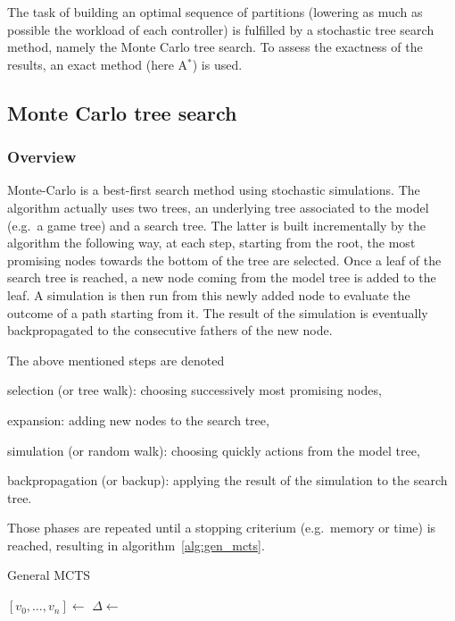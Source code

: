 \documentclass[twoside,twocolumn]{article}
\begin{document}
The task of building an optimal sequence of partitions (lowering
as much as possible the workload of each controller) is fulfilled by a
stochastic tree search method, namely the Monte Carlo tree search. To assess the
exactness of the results, an exact method (here A\(^*\)) is used.

\subsection{Monte Carlo tree search}
\subsubsection{Overview}
Monte-Carlo is a best-first search method using stochastic simulations. The
algorithm actually uses two trees, an underlying tree associated to the model
(e.g.\ a game tree) and a search tree. The latter is built incrementally by the
algorithm the following way, at each step, starting from the root, the most
promising nodes towards the bottom of the tree are selected. Once a leaf of the
search tree is reached, a new node coming from the model tree is added to the
leaf. A simulation is then run from this newly added node to evaluate the
outcome of a path starting from it. The result of the simulation is eventually
backpropagated to the consecutive fathers of the new node.

The above mentioned steps are denoted
\begin{compactenum}
	\item selection (or tree walk): choosing successively most promising nodes,
	\item expansion: adding new nodes to the search tree,
	\item simulation (or random walk): choosing quickly actions from the model
		tree,
	\item backpropagation (or backup): applying the result of the simulation to
		the search tree.
\end{compactenum}
Those phases are repeated until a stopping criterium (e.g.\ memory or time) is
reached, resulting in algorithm~\ref{alg:gen_mcts}.
\begin{algorithm}
	\caption{General MCTS~\cite{browne2012survey}}\label{alg:gen_mcts}
	\begin{algorithmic}
		\State{} \([v_0, \dots, v_n] \gets\) 
		\State{} \(\Delta \gets\) 
		\State{} 
		\EndWhile{}
		\EndProcedure{}
	\end{algorithmic}
\end{algorithm}
\end{document}

